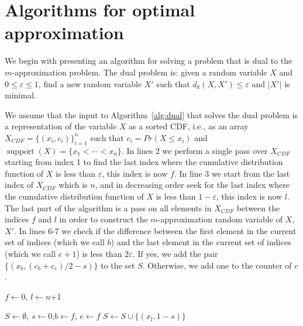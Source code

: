 \documentclass[letterpaper]{article} %
\DeclareMathOperator{\supp}{support}
\begin{document}
\section{Algorithms for optimal approximation}\label{sec:algEfficient}

We begin with presenting an algorithm for solving a problem that is dual to the $m$-approximation problem.  The dual problem is: given a random variable $X$ and $0 \leq \varepsilon \leq 1$, find a new random variable $X'$ such that $d_k(X,X')\leq \varepsilon$ and $|X'|$ is minimal. 

We assume that the input to Algorithm~\ref{alg:dual} that solves the dual problem is a representation of the variable $X$ as a sorted CDF, i.e.,  as an array $X_{CDF}=\{(x_i, c_i)\}_{i=1}^n$ such that $c_i = Pr(X \leq x_i)$ and $\supp(X)=\{x_1 <\cdots < x_n\}$. In lines 2 we perform a single pass over $X_{CDF}$ starting from index 1 to find the last index where the cumulative distribution function of $X$ is less than $\varepsilon$, this index is now $f$. In line 3 we start from the last index of $X_{CDF}$ which is $n$, and in decreasing order seek for the last index where the cumulative distribution function of $X$ is less than $1-\varepsilon$, this index is now $l$. The last part of the algorithm is a pass on all elements in $X_{CDF}$ between the indices $f$ and $l$ in order to construct the $m$-approximation random variable of $X$, $X'$. In lines 6-7 we check if the difference between the first element in the current set of indices (which we call $b$) and the last element in the current set of indices (which we call $e+1$) is less than $2\varepsilon$. If yes, we add the pair $\{(x_{b}, (c_b+c_e)/2 - s) \}$ to the set $S$. Otherwise, we add one to the counter of $e$. 

\begin{algorithm}
	\DontPrintSemicolon
    $f \gets 0$, $l \gets n$+1\; 


	$S \gets \emptyset$, $s \gets 0$,$b \gets f$, $e \gets f$\;
	$S \gets S \cup \{(x_{l}, 1 - s) \}$\;
    	
    	
	
	\caption{$dual(\{(x_i, c_i)\}_{i=1}^n,\varepsilon)$  }   
	\label{alg:dual}
\end{algorithm}
\end{document}
